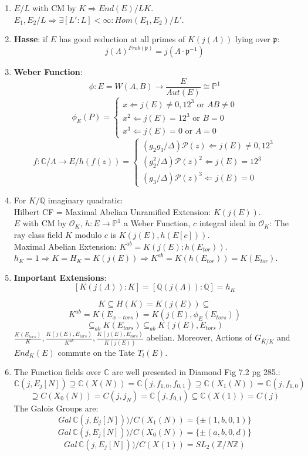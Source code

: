 \documentclass{article}
\newcommand{\Q}{\mathbb{Q}}
\newcommand{\C}{\mathbb{C}}
\newcommand{\Z}{\mathbb{Z}}
\newcommand{\PP}{\mathbb{P}}
\newcommand{\OO}{\mathcal{O}}
\newcommand{\pp}{\mathfrak{p}}
\newcommand{\wf}{\mathcal{P}}
\newcommand{\ra}{\rightarrow}
\newcommand{\Ra}{\Rightarrow}
\newcommand{\La}{\Leftarrow}
\begin{document}
\begin{multicols}{2}
\begin{enumerate}
\item $E/L$ with CM by $K \Ra End(E)/LK$.\\
$E_1,E_2/L \Ra \exists [L':L] < \infty: Hom(E_1,E_2)/L'$.

\item \textbf{Hasse}: if $E$ has good reduction at all primes of $K(j(\Lambda))$ lying over $\pp$: $$j(\Lambda)^{Frob(\pp)} = j(\Lambda \cdot \pp^{-1})$$

\item \textbf{Weber Function}: 
\[\phi: E = W(A,B) \ra \frac{E}{Aut(E)} \cong \PP^1\] 
\[\phi_E(P) = \left\{\begin{array}{l} x \La j(E) \neq 0, 12^3 \textrm{ or } AB \neq 0 \\  x^2 \La j(E) = 12^3 \textrm{ or } B = 0 \\ x^3 \La j(E) = 0 \textrm{ or } A = 0 \end{array}\right.\]
\[f: \C/\Lambda \ra E/ h(f(z)) = \left\{\begin{array}{l} (g_2g_3/\Delta)\wf(z) \La j(E) \neq 0, 12^3\\  (g_2^2/\Delta)\wf(z)^2 \La j(E) = 12^3 \\ (g_3/\Delta)\wf(z)^3 \La j(E) = 0 \end{array}\right.\]


\item For $K/\Q$ imaginary quadratic:\\
Hilbert CF = Maximal Abelian Unramified Extension: $K(j(E))$.\\
$E$ with CM by $\OO_K$, $h: E \ra \PP^1$ a Weber Function, $c$ integral ideal in $\OO_K$: The ray class field $K$ modulo $c$ is $K(j(E), h(E[c]))$. \\ 
Maximal Abelian Extension: $K^{ab} = K(j(E); h(E_{tor}))$.\\
$h_K = 1 \Ra K = H_K = K(j(E)) \Ra K^{ab} = K(h(E_{tor})) = K(E_{tor})$. 

\item \textbf{Important Extensions}: \[[K(j(\Lambda)):K] = [\Q(j(\Lambda)):\Q] = h_K\]

\[K \subseteq H(K) = K(j(E)) \subseteq \]
\[K^{ab} = K(E_{x-tors}) = K(j(E),\phi_E(E_{tors}))\]\[\subseteq_{ab} K(E_{tors}) \subseteq_{ab} K(j(E),E_{tors})\]
$\frac{K(E_{tors})}{K}, \frac{K(j(E),E_{tors})}{K^{ab}}, \frac{K(j(E),E_{tors})}{K(j(E))}$ abelian. Moreover, Actions of $G_{\overline{K}/K}$ and $End_K(E)$ commute on the Tate $T_l(E)$.

\item The Function fields over $\C$ are well presented in Diamond Fig 7.2 pg 285.:
\[\C(j, E_j[N]) \supseteq \C(X(N)) = \C(j,f_{1,0},f_{0,1}) \supseteq \C(X_1(N)) = \C(j,f_{1,0})\]
\[\supseteq C(X_0(N)) = C(j,j_N) = \C(j,f_{0,1}) \subseteq \C(X(1)) = C(j)\]
The Galois Groups are:
\[Gal \, \C(j,E_j[N]))/C(X_1(N)) = \{\pm (1,b,0,1)\}\]
\[Gal \, \C(j,E_j[N]))/C(X_0(N)) = \{\pm (a,b,0,d)\}\]
\[Gal \, \C(j,E_j[N]))/C(X(1)) = SL_2(\Z/N\Z)\]


\end{enumerate}
\end{multicols}
\end{document}
